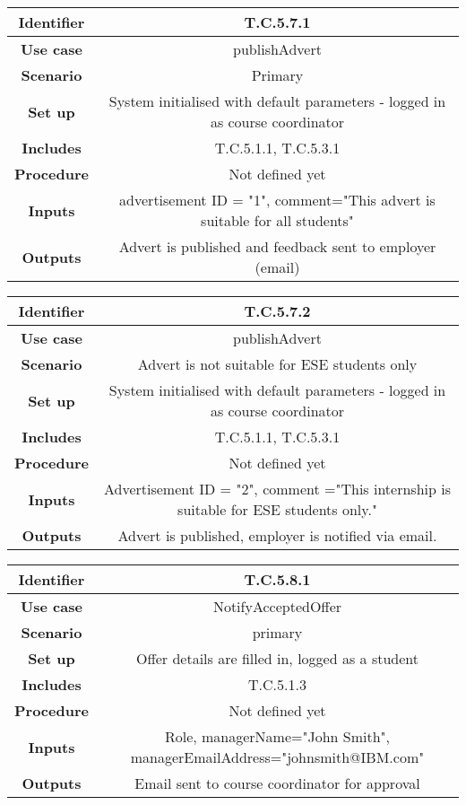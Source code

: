 \begin{tabular}{|c|c|}
\hline \textbf{Identifier} & T.C.5.7.1\\
\hline \textbf{Use case} & publishAdvert\\
\hline \textbf{Scenario} & Primary\\
\hline \textbf{Set up} & System initialised with default parameters - logged in as course coordinator\\
\hline \textbf{Includes} & T.C.5.1.1, T.C.5.3.1\\
\hline \textbf{Procedure} & Not defined yet\\
\hline \textbf{Inputs} & advertisement ID = "1", comment="This advert is suitable for all students"\\
\hline \textbf{Outputs} & Advert is published and feedback sent to employer (email)\\
\hline
\end{tabular}

\begin{tabular}{|c|c|}
\hline \textbf{Identifier} & T.C.5.7.2\\
\hline \textbf{Use case} & publishAdvert\\
\hline \textbf{Scenario} & Advert is not suitable for ESE students only\\
\hline \textbf{Set up} & System initialised with default parameters - logged in as course coordinator\\
\hline \textbf{Includes} & T.C.5.1.1, T.C.5.3.1\\
\hline \textbf{Procedure} & Not defined yet\\
\hline \textbf{Inputs} & Advertisement ID = "2", comment ="This internship is suitable for ESE students only."\\
\hline \textbf{Outputs} & Advert is published, employer is notified via email.\\
\hline
\end{tabular}

\begin{tabular}{|c|c|}
\hline \textbf{Identifier} & T.C.5.8.1\\
\hline \textbf{Use case} & NotifyAcceptedOffer\\
\hline \textbf{Scenario} & primary\\
\hline \textbf{Set up} & Offer details are filled in, logged as a student\\
\hline \textbf{Includes} & T.C.5.1.3\\
\hline \textbf{Procedure} & Not defined yet\\
\hline \textbf{Inputs} & Role, managerName="John Smith", managerEmailAddress="johnsmith@IBM.com"\\
\hline \textbf{Outputs} & Email sent to course coordinator for approval\\
\hline
\end{tabular}

